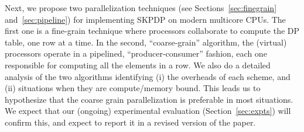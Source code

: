 Next, we propose two parallelization techniques (see
Sections~\ref{sec:finegrain} and~\ref{sec:pipeline}) for implementing SKPDP on
modern multicore CPUs.  The first one is a fine-grain technique where
processors collaborate to compute the DP table, one row at a time.  In the
second, ``coarse-grain'' algorithm, the (virtual) processors operate in a
pipelined, ``producer-consumer'' fashion, each one responsible for computing
all the elements in a row.  We also do a detailed analysis of the two
algorithms identifying (i) the overheads of each scheme, and (ii) situations
when they are compute/memory bound.  This leads us to hypothesize that the
coarse grain parallelization is preferable in most situations.  We expect that
our (ongoing) experimental evaluation (Section~\ref{sec:expts}) will confirm
this, and expect to report it in a revised version of the paper.

